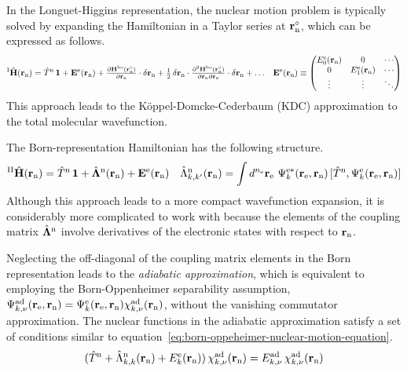 \documentclass[11pt]{article}
\begin{document}
\begin{rmk}
In the Longuet-Higgins representation, the nuclear motion problem is typically solved by expanding the Hamiltonian in a Taylor series at $\mathbf{r}_{\mathrm{n}}^\circ$, which can be expressed as follows.
\begin{align}
  {}^\mr{I}\op{\bo{H}}(\bo{r}_\mr{n})
=
  \op{T}^\mr{n}\,
  \bo{1}
+
  \bo{E}^\mr{e}(\bo{r}_\mr{n})
+
  \tpd{
    \bo{H}^\mr{bo}(\bo{r}_\mr{n}^\circ)
  }{
    \bo{r}_\mr{n}
  }
  \cdot
  \d\bo{r}_\mr{n}
+
  \tfr{1}{2}\,
  \d\bo{r}_\mr{n}
  \cdot
  \tpd{
    ^2\bo{H}^\mr{bo}(\bo{r}_\mr{n}^\circ)
  }{
    \bo{r}_\mr{n}
    \pt
    \bo{r}_\mr{n}
  }
  \cdot
  \d\bo{r}_\mr{n}
+
  \ld
&&
  \bo{E}^\mr{e}(\bo{r}_\mr{n})
\equiv
  \ma{
    E_0^\mr{e}(\bo{r}_\mr{n}) & 0 & \cd \\
    0 & E_1^\mr{e}(\bo{r}_\mr{n}) & \cd \\
    \vd & \vd & \dd \\
  }
\end{align}
This approach leads to the K\"oppel-Domcke-Cederbaum (KDC) approximation to the total molecular wavefunction.
\end{rmk}

\begin{rmk}
The Born-representation Hamiltonian has the following structure.
\begin{align}
  {}^\mr{II}\op{\bo{H}}(\bo{r}_\mr{n})
=
  \op{T}^\mr{n}\,
  \bo{1}
+
  \op{\bm{\La}}^\mr{n}(\bo{r}_\mr{n})
+
  \bo{E}^\mr{e}(\bo{r}_\mr{n})
&&
  \op{\La}_{k,k'}^\mr{n}(\bo{r}_\mr{n})
=
  \int
  d^{n_\mr{e}}\bo{r}_\mr{e}\,\,
  \Y_k^{\mr{e}*}(\bo{r}_\mr{e},\bo{r}_\mr{n})\,
  [
    \op{T}^\mr{n}
  ,
    \Y_k^\mr{e}(\bo{r}_\mr{e},\bo{r}_\mr{n})
  ]
\end{align}
Although this approach leads to a more compact wavefunction expansion, it is considerably more complicated to work with because the elements of the coupling matrix $\op{\bm{\La}}^\mr{n}$ involve derivatives of the electronic states with respect to $\mathbf{r}_{\mathrm{n}}$.
\end{rmk}

\begin{dfn}
Neglecting the off-diagonal of the coupling matrix elements in the Born representation leads to the \textit{adiabatic approximation}, which is equivalent to employing the Born-Oppenheimer separability assumption,
$
  \Y_{k,\nu}^\mr{ad}(\bo{r}_\mr{e},\bo{r}_\mr{n})
=
  \Y_k^\mr{e}(\bo{r}_\mr{e},\bo{r}_\mr{n})
  \x_{k,\nu}^\mr{ad}(\bo{r}_\mr{n})
$,
without the vanishing commutator approximation.
The nuclear functions in the adiabatic approximation satisfy a set of conditions similar to equation~\ref{eq:born-oppeheimer-nuclear-motion-equation}.
\begin{align}
  (
    \op{T}^\mr{n}
  +
    \op{\La}_{k,k}^\mr{n}(\bo{r}_\mr{n})
  +
    E_k^\mr{e}(\bo{r}_\mr{n})
  )\,
  \x_{k,\nu}^\mr{ad}(\bo{r}_\mr{n})
=
  E_{k,\nu}^\mr{ad}\,
  \x_{k,\nu}^\mr{ad}(\bo{r}_\mr{n})
\end{align}
\end{dfn}
\end{document}
